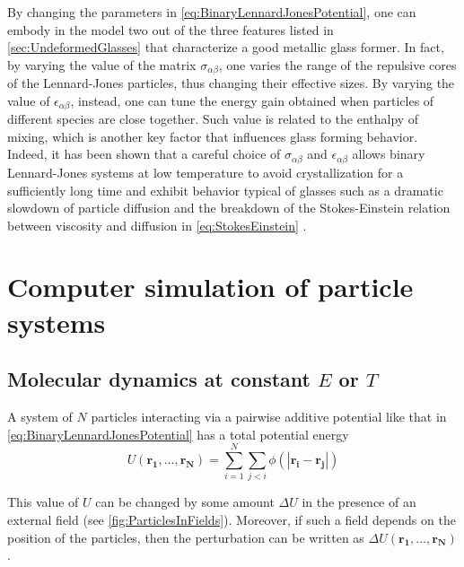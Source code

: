 By changing the parameters in \autoref{eq:BinaryLennardJonesPotential}, one can embody in the model two out of the three features listed in \autoref{sec:UndeformedGlasses} that characterize a good metallic glass former. In fact, by varying the value of the matrix $\sigma_{\alpha \beta}$, one varies the range of the repulsive cores of the Lennard-Jones particles, thus changing their effective sizes. By varying the value of $\epsilon_{\alpha \beta}$, instead, one can tune the energy gain obtained when particles of different species are close together. Such value is related to the enthalpy of mixing, which is another key factor that influences glass forming behavior.
Indeed, it has been shown that a careful choice of $\sigma_{\alpha \beta}$ and $\epsilon_{\alpha \beta}$ allows binary Lennard-Jones systems at low temperature to avoid crystallization \cite{toxvaerd2009stability} for a sufficiently long time and exhibit behavior typical of glasses such as a dramatic slowdown of particle diffusion and the breakdown of the Stokes-Einstein relation between viscosity and diffusion in \autoref{eq:StokesEinstein} \cite{bordat2003breakdown}.

\section{Computer simulation of particle systems}

\subsection{Molecular dynamics at constant $E$ or $T$ \label{sec:MolecularDynamics}}

A system of $N$ particles interacting via a pairwise additive potential like that in \autoref{eq:BinaryLennardJonesPotential} has a total potential energy
\begin{equation}
	U(\mathbf{r_{1}, \ldots, r_{N}}) = \sum_{i=1}^{N} \sum_{j<i} \phi(|\mathbf{r_{i} - r_{j}}|)
	\label{eq:TotalPairwiseAdditivePotentialEnergy}
\end{equation}

This value of $U$ can be changed by some amount $\Delta U$ in the presence of an external field (see \autoref{fig:ParticlesInFields}). Moreover, if such a field depends on the position of the particles, then the perturbation can be written as $\Delta U(\mathbf{r_{1}, \ldots, r_{N}})$. 

